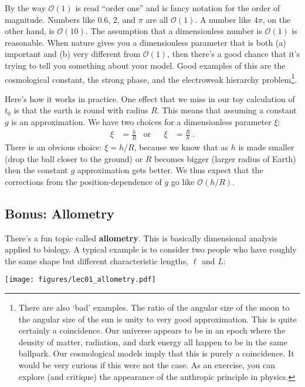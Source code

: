 By the way $\mathcal O(1)$ is read ``order one'' and is fancy notation for the order of magnitude. Numbers like 0.6, 2, and $\pi$ are all $\mathcal O(1)$. A number like $4\pi$, on the other hand, is $\mathcal O(10)$.  The assumption that a dimensionless number is $\mathcal O(1)$ is reasonable. When nature gives you a dimensionless parameter that is both (a) important and (b) very different from $\mathcal O(1)$, then there's a good chance that it's trying to tell you something about your model. Good examples of this are the cosmological constant, the strong  phase, and the electroweak hierarchy problem\footnote{There are also `bad' examples. The ratio of the angular size of the moon to the angular size of the sun is unity to very good approximation. This is quite certainly a coincidence. Our universe appears to be in an epoch where the density of matter, radiation, and dark energy all happen to be in the same ballpark. Our cosmological models imply that this is purely a coincidence. It would be very curious if this were not the case. As an exercise, you can explore (and critique) the appearance of the anthropic principle in physics.}. 

Here’s how it works in practice. One effect that we miss in our toy calculation of $t_0$ is that the earth is round with radius $R$. This means that assuming a constant $g$ is an approximation. We have two choices for a dimensionless parameter $\xi$:
\begin{align}
  \xi &= \frac{h}{R}
  &\text{or}&&
  \xi &= \frac{R}{h} \ .
\end{align}
There is an obvious choice: $\xi = h/R$, because we know that as $h$ is made smaller (drop the ball closer to the ground) or $R$ becomes bigger (larger radius of Earth) then the constant $g$ approximation gets better. We thus expect that the corrections from the position-dependence of $g$ go like $\mathcal O(h/R)$.
 


\subsection{Bonus: Allometry}

There’s a fun topic called \textbf{allometry}. This is basically dimensional analysis applied to biology. A typical example is to consider two people who have roughly the same shape but different characteristic lengths, $\ell$ and $L$:

\begin{center}
\texttt{[image: figures/lec01\_allometry.pdf]}
\end{center}

